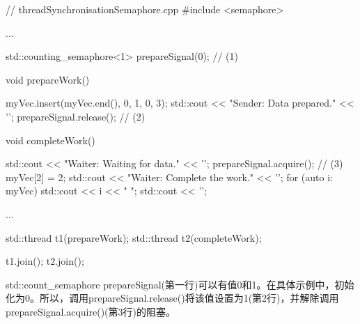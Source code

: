 \begin{cpp}
// threadSynchronisationSemaphore.cpp
#include <semaphore>

...

std::counting_semaphore<1> prepareSignal(0); // (1)

void prepareWork() {
	
	myVec.insert(myVec.end(), {0, 1, 0, 3});
	std::cout << "Sender: Data prepared." << '\n';
	prepareSignal.release(); // (2)
}

void completeWork() {
	
	std::cout << "Waiter: Waiting for data." << '\n';
	prepareSignal.acquire(); // (3)
	myVec[2] = 2;
	std::cout << "Waiter: Complete the work." << '\n';
	for (auto i: myVec) std::cout << i << " ";
	std::cout << '\n';
}

...

std::thread t1(prepareWork);
std::thread t2(completeWork);

t1.join();
t2.join();
\end{cpp}

std::count\_semaphore prepareSignal(第一行)可以有值0和1。在具体示例中，初始化为0。所以，调用prepareSignal.release()将该值设置为1(第2行)，并解除调用prepareSignal.acquire()(第3行)的阻塞。


































